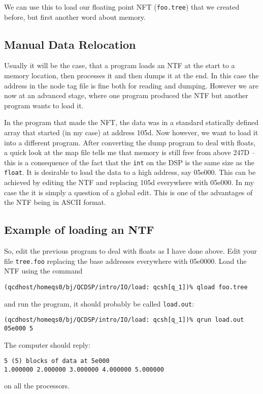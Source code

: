 We can use this to load our floating point NFT ({\tt foo.tree}) that 
we created before, but first another word about memory.

\subsection{Manual Data Relocation}
Usually it will be the case, that a program loads an NTF at the start
to a memory location, then processes it and then dumps it at the end.
In this case the address in the node tag file is fine both for reading 
and dumping. However we are now at an advanced stage, where one program
produced the NTF but another program wants to load it.

 In the program that made the NFT, the data was in a standard
statically defined array that started (in my case) at address
105d. Now however, we want to load it into a different program.  After
converting the dump program to deal with floats, a quick look at the
map file tells me that memory is still free from above 247D -- this is
a consequence of the fact that the {\tt int} on the DSP is the same
size as the {\tt float}. It is desirable to load the data to a high address,
say 05e000. This can be achieved by editing the NTF and replacing 105d
everywhere with 05e000. In my case the it is simply a question of a global
edit. This is one of the advantages of the NTF being in ASCII format.

\subsection{Example of loading an NTF}
So, edit the previous program to deal with floats as I have done above.
Edit your file {\tt tree.foo} replacing the base addresses everywhere with
05e0000. Load the NTF using the command
\begin{verbatim} 
(qcdhost/homeqs0/bj/QCDSP/intro/IO/load: qcsh[q_1])% qload foo.tree
\end{verbatim}
and run the program, it should probably be called {\tt load.out}:
\begin{verbatim}
(qcdhost/homeqs0/bj/QCDSP/intro/IO/load: qcsh[q_1])% qrun load.out 05e000 5
\end{verbatim}
The computer should reply:
\begin{verbatim}
5 (5) blocks of data at 5e000
1.000000 2.000000 3.000000 4.000000 5.000000 
\end{verbatim}
on all the processors.

